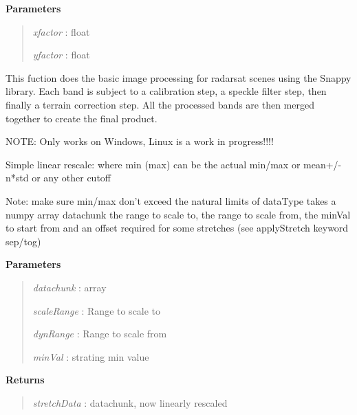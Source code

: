 \documentclass[letterpaper,10pt,openany,oneside]{sphinxmanual}
\begin{document}
\begin{fulllineitems}
\begin{fulllineitems}
\textbf{Parameters}
\begin{quote}

\emph{xfactor} : float

\emph{yfactor} : float
\end{quote}

\end{fulllineitems}


\begin{fulllineitems}
\label{code:Image.Image.snapImageProcess}
This fuction does the basic image processing for radarsat scenes using
the Snappy library. Each band is subject to a calibration step, a
speckle filter step, then finally a terrain correction step. All the
processed bands are then merged together to create the final product.

NOTE: Only works on Windows, Linux is a work in progress!!!!

\end{fulllineitems}


\begin{fulllineitems}
\label{code:Image.Image.stretchLinear}
Simple linear rescale: where min (max) can be the actual min/max or mean+/- n*std or any other cutoff

Note: make sure min/max don't exceed the natural limits of dataType
takes a numpy array datachunk the range to scale to, the range to scale
from, the minVal to start from and an offset required for some stretches
(see applyStretch keyword sep/tog)

\textbf{Parameters}
\begin{quote}

\emph{datachunk}   : array

\emph{scaleRange}  : Range to scale to

\emph{dynRange}    : Range to scale from

\emph{minVal}      : strating min value
\end{quote}

\textbf{Returns}
\begin{quote}

\emph{stretchData} : datachunk, now linearly rescaled
\end{quote}


\end{fulllineitems}
\end{fulllineitems}
\end{document}

